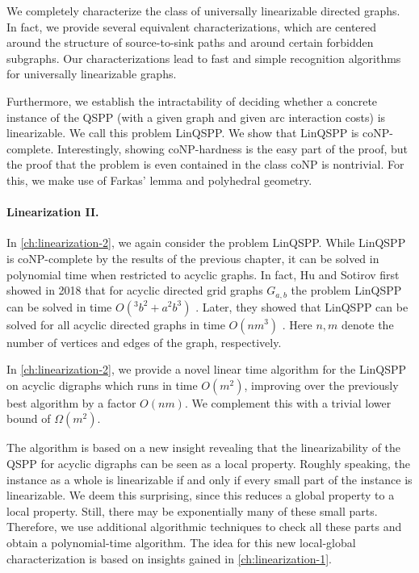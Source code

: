 We completely characterize the class of universally linearizable directed graphs.
In fact, we provide several equivalent characterizations, which are centered around the structure of source-to-sink paths and around certain forbidden subgraphs. Our characterizations lead to fast and simple recognition algorithms for universally linearizable graphs. 

Furthermore, we establish the intractability of deciding whether a concrete instance of the QSPP (with a given graph and given arc interaction costs) is linearizable. We call this problem LinQSPP. We show that LinQSPP is coNP-complete. Interestingly, showing coNP-hardness is the easy part of the proof, but the proof that the problem is even contained in the class coNP is nontrivial. For this, we make use of Farkas' lemma \cite{Farkas1902} and polyhedral geometry.


\paragraph*{Linearization II.}
In \cref{ch:linearization-2}, we again consider the problem LinQSPP.
While LinQSPP is coNP-complete by the results of the previous chapter, it can be solved in polynomial time when restricted to acyclic graphs.
In fact, Hu and Sotirov first showed in 2018 that for acyclic directed grid graphs $G_{a,b}$ the problem LinQSPP can be solved in time $O(^3b^2 + a^2b^3)$ \cite{huSo2018}. Later, they showed that LinQSPP can be solved for all acyclic directed graphs in time $O(nm^3)$ \cite{huSo2021}. Here $n,m$ denote the number of vertices and edges of the graph, respectively.

In \cref{ch:linearization-2}, we provide a novel linear time algorithm for the LinQSPP on acyclic digraphs which runs in time $O(m^2)$, improving over the previously best algorithm by a factor $O(nm)$. We complement this with a trivial lower bound of $\Omega(m^2)$.

The algorithm is based on a new insight revealing that the linearizability of the QSPP for acyclic digraphs can be seen as a local property. Roughly speaking, the instance as a whole is linearizable if and only if every small part of the instance is linearizable. We deem this surprising, since this reduces a global property to a local property. Still, there may be exponentially many of these small parts. Therefore, we use additional algorithmic techniques to check all these parts and obtain a polynomial-time algorithm. The idea for this new local-global characterization is based on insights gained in \cref{ch:linearization-1}.

